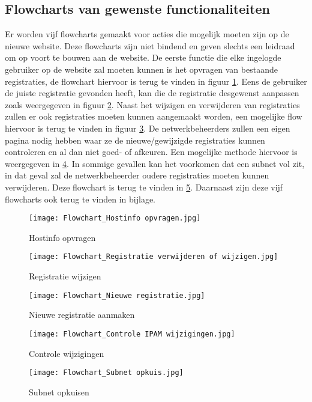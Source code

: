 \subsection{Flowcharts van gewenste functionaliteiten}
Er worden vijf flowcharts gemaakt voor acties die mogelijk moeten zijn op de nieuwe website. Deze flowcharts zijn niet bindend en geven slechts een leidraad om op voort te bouwen aan de website.
De eerste functie die elke ingelogde gebruiker op de website zal moeten kunnen is het opvragen van bestaande registraties, de flowchart hiervoor is terug te vinden in figuur  \ref{fig:flowchart_hostinfo_opvragen}. Eens de gebruiker de juiste registratie gevonden heeft, kan die de registratie desgewenst aanpassen zoals weergegeven in figuur \ref{fig:flowchart_registratie_wijzigen}. Naast het wijzigen en verwijderen van registraties zullen er ook registraties moeten kunnen aangemaakt worden, een mogelijke flow hiervoor is terug te vinden in figuur \ref{fig:flowchart_nieuwe_registratie}.
De netwerkbeheerders zullen een eigen pagina nodig hebben waar ze de nieuwe/gewijzigde registraties kunnen controleren en al dan niet goed- of afkeuren. Een mogelijke methode hiervoor is weergegeven in \ref{fig:flowchart_controle_Wijzigingen}. In sommige gevallen kan het voorkomen dat een subnet vol zit, in dat geval zal de netwerkbeheerder oudere registraties moeten kunnen verwijderen. Deze flowchart is terug te vinden in \ref{fig:flowchart_subnet_opkuisen}. Daarnaast zijn deze vijf flowcharts ook terug te vinden in bijlage.

\begin{figure}[H]
	\texttt{[image: Flowchart\_Hostinfo opvragen.jpg]}
	\caption{Hostinfo opvragen}
	\label{fig:flowchart_hostinfo_opvragen}
\end{figure}
\begin{figure}[H]
    \texttt{[image: Flowchart\_Registratie verwijderen of wijzigen.jpg]}
    \caption{Registratie wijzigen}
    \label{fig:flowchart_registratie_wijzigen}
\end{figure}
\begin{figure}[H]
    \texttt{[image: Flowchart\_Nieuwe registratie.jpg]}
    \caption{Nieuwe registratie aanmaken}
    \label{fig:flowchart_nieuwe_registratie}
\end{figure}
\begin{figure}[H]
    \texttt{[image: Flowchart\_Controle IPAM wijzigingen.jpg]}
    \caption{Controle wijzigingen}
    \label{fig:flowchart_controle_Wijzigingen}
\end{figure}
\begin{figure}[H]
    \texttt{[image: Flowchart\_Subnet opkuis.jpg]}
    \caption{Subnet opkuisen}
    \label{fig:flowchart_subnet_opkuisen}
\end{figure}

